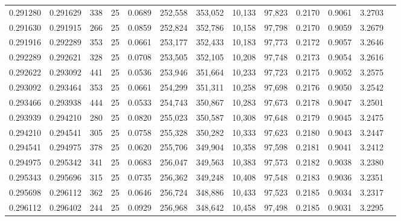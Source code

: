 \begin{tabular}{rrrrrrrrrrrrr}
0.291280 & 0.291629 &   338 &  25 &                                     0.0689 & 252,558 & 353,052 &  10,133 &  97,823 & 0.2170 & 0.9061 & 3.2703 \\
0.291630 & 0.291915 &   266 &  25 &                                     0.0859 & 252,824 & 352,786 &  10,158 &  97,798 & 0.2170 & 0.9059 & 3.2679 \\
0.291916 & 0.292289 &   353 &  25 &                                     0.0661 & 253,177 & 352,433 &  10,183 &  97,773 & 0.2172 & 0.9057 & 3.2646 \\
0.292289 & 0.292621 &   328 &  25 &                                     0.0708 & 253,505 & 352,105 &  10,208 &  97,748 & 0.2173 & 0.9054 & 3.2616 \\
0.292622 & 0.293092 &   441 &  25 &                                     0.0536 & 253,946 & 351,664 &  10,233 &  97,723 & 0.2175 & 0.9052 & 3.2575 \\
0.293092 & 0.293464 &   353 &  25 &                                     0.0661 & 254,299 & 351,311 &  10,258 &  97,698 & 0.2176 & 0.9050 & 3.2542 \\
0.293466 & 0.293938 &   444 &  25 &                                     0.0533 & 254,743 & 350,867 &  10,283 &  97,673 & 0.2178 & 0.9047 & 3.2501 \\
0.293939 & 0.294210 &   280 &  25 &                                     0.0820 & 255,023 & 350,587 &  10,308 &  97,648 & 0.2179 & 0.9045 & 3.2475 \\
0.294210 & 0.294541 &   305 &  25 &                                     0.0758 & 255,328 & 350,282 &  10,333 &  97,623 & 0.2180 & 0.9043 & 3.2447 \\
0.294541 & 0.294975 &   378 &  25 &                                     0.0620 & 255,706 & 349,904 &  10,358 &  97,598 & 0.2181 & 0.9041 & 3.2412 \\
0.294975 & 0.295342 &   341 &  25 &                                     0.0683 & 256,047 & 349,563 &  10,383 &  97,573 & 0.2182 & 0.9038 & 3.2380 \\
0.295343 & 0.295696 &   315 &  25 &                                     0.0735 & 256,362 & 349,248 &  10,408 &  97,548 & 0.2183 & 0.9036 & 3.2351 \\
0.295698 & 0.296112 &   362 &  25 &                                     0.0646 & 256,724 & 348,886 &  10,433 &  97,523 & 0.2185 & 0.9034 & 3.2317 \\
0.296112 & 0.296402 &   244 &  25 &                                     0.0929 & 256,968 & 348,642 &  10,458 &  97,498 & 0.2185 & 0.9031 & 3.2295 \\

\end{tabular}
